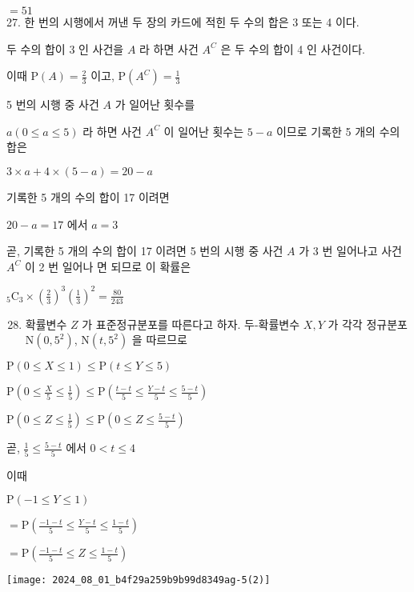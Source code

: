 \documentclass[10pt]{article}
\begin{document}
$=51$\\
27. 한 번의 시행에서 꺼낸 두 장의 카드에 적힌 두 수의 합은 3 또는 4 이다.

두 수의 합이 3 인 사건을 $A$ 라 하면 사건 $A^{C}$ 은 두 수의 합이 4 인 사건이다.

이때 $\mathrm{P}(A)=\frac{2}{3}$ 이고, $\mathrm{P}\left(A^{C}\right)=\frac{1}{3}$

5 번의 시행 중 사건 $A$ 가 일어난 횟수를

$a(0 \leq a \leq 5)$ 라 하면 사건 $A^{C}$ 이 일어난 횟수는 $5-a$ 이므로 기록한 5 개의 수의 합은

$3 \times a+4 \times(5-a)=20-a$

기록한 5 개의 수의 합이 17 이려면

$20-a=17$ 에서 $a=3$

곧, 기록한 5 개의 수의 합이 17 이려면 5 번의 시행 중 사건 $A$ 가 3 번 일어나고 사건 $A^{C}$ 이 2 번 일어나 면 되므로 이 확률은

${ }_{5} \mathrm{C}_{3} \times\left(\frac{2}{3}\right)^{3}\left(\frac{1}{3}\right)^{2}=\frac{80}{243}$

\begin{enumerate}
  \setcounter{enumi}{27}
  \item 확률변수 $Z$ 가 표준정규분포를 따른다고 하자. 두-확률변수 $X, Y$ 가 각각 정규분포 $\mathrm{N}\left(0,5^{2}\right)$, $\mathrm{N}\left(t, 5^{2}\right)$ 을 따르므로
\end{enumerate}

$\mathrm{P}(0 \leq X \leq 1) \leq \mathrm{P}(t \leq Y \leq 5)$

$\mathrm{P}\left(0 \leq \frac{X}{5} \leq \frac{1}{5}\right) \leq \mathrm{P}\left(\frac{t-t}{5} \leq \frac{Y-t}{5} \leq \frac{5-t}{5}\right)$

$\mathrm{P}\left(0 \leq Z \leq \frac{1}{5}\right) \leq \mathrm{P}\left(0 \leq Z \leq \frac{5-t}{5}\right)$

곧, $\frac{1}{5} \leq \frac{5-t}{5}$ 에서 $0<t \leq 4$

이때

$\mathrm{P}(-1 \leq Y \leq 1)$

$=\mathrm{P}\left(\frac{-1-t}{5} \leq \frac{Y-t}{5} \leq \frac{1-t}{5}\right)$

$=\mathrm{P}\left(\frac{-1-t}{5} \leq Z \leq \frac{1-t}{5}\right)$

\begin{center}
\texttt{[image: 2024\_08\_01\_b4f29a259b9b99d8349ag-5(2)]}
\end{center}
\end{document}
